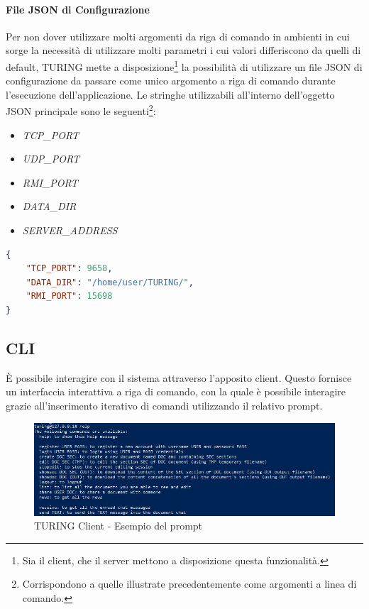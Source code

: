 \paragraph{File JSON di Configurazione}
Per non dover utilizzare molti argomenti da riga di comando in ambienti in cui sorge la necessità di utilizzare molti parametri i cui valori differiscono da quelli di default, TURING mette a disposizione\footnote{Sia il client, che il server mettono a disposizione questa funzionalità.} la possibilità di utilizzare un file JSON di configurazione da passare come unico argomento a riga di comando durante l'esecuzione dell'applicazione.
\newline
Le stringhe utilizzabili all'interno dell'oggetto JSON principale sono le seguenti\footnote{Corrispondono a quelle illustrate precedentemente come argomenti a linea di comando.}:
\begin{itemize}
	\item \textit{TCP\_PORT}
	\item \textit{UDP\_PORT}
	\item \textit{RMI\_PORT}
	\item \textit{DATA\_DIR}
	\item \textit{SERVER\_ADDRESS}
\end{itemize}

\begin{lstlisting}[caption="JSON File - Esempio", language=JSON]
{
	"TCP_PORT": 9658,
	"DATA_DIR": "/home/user/TURING/",
	"RMI_PORT": 15698
}
\end{lstlisting}

\subsection{CLI}
È possibile interagire con il sistema attraverso l'apposito client. Questo fornisce un interfaccia interattiva a riga di comando, con la quale è possibile interagire grazie all'inserimento iterativo di comandi utilizzando il relativo prompt.

\begin{figure}[h]
	\caption{TURING Client - Esempio del prompt}
	\centering
		\includegraphics[width=0.8\linewidth]{assets/help_message}
\end{figure}
